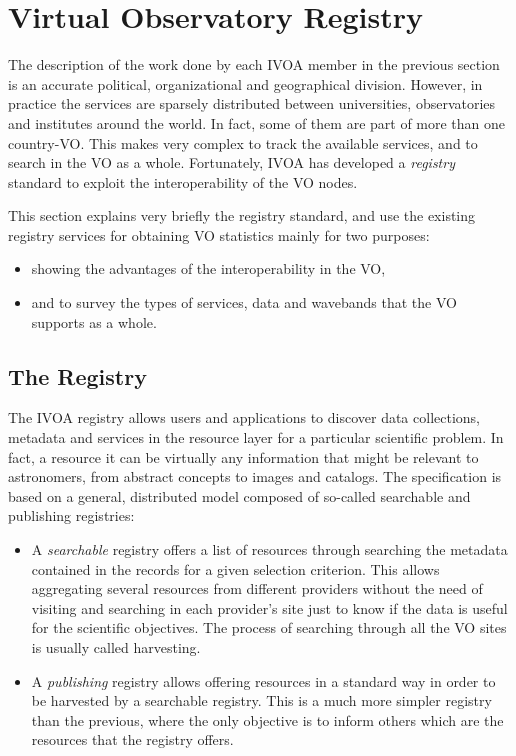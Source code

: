 \section{Virtual Observatory Registry}
\label{sec:registry}

The description of the work done by each IVOA member
in the previous section is an accurate political, organizational 
and geographical division. However, in practice the services
are sparsely distributed between universities, observatories
and institutes around the world. In fact, some of them 
are part of more than one country-VO. 
This makes very complex to track the available services, 
and to search in the VO as a whole. Fortunately, 
IVOA has developed a \emph{registry} standard to 
exploit the interoperability of the VO nodes.

This section explains very briefly the registry standard,
and use the existing registry services for obtaining VO 
statistics mainly for two purposes:
\begin{itemize}
\item showing the advantages of the interoperability in the VO,
\item and to survey the types of services, data and wavebands that
the VO supports as a whole.
\end{itemize}

\subsection{The Registry}

The IVOA registry allows users and applications to discover data collections,
metadata and services in the resource layer for a particular scientific
problem. In fact, a resource it can be virtually any information that might be
relevant to astronomers, from abstract concepts to images and catalogs. 
The specification is based on a general, distributed model composed of
so-called searchable and publishing registries:
\begin{itemize}
\item A \emph{searchable} registry offers a list of resources through searching the 
metadata contained in the records for a given selection criterion.
This allows aggregating several resources from different providers 
without the need of visiting and searching in each provider's site just to
know if the data is useful for the scientific objectives.
The process of searching through all the VO sites is usually called harvesting.
\item A \emph{publishing} registry allows offering resources in a standard way
in order to be harvested by a searchable registry. This is a much more
simpler registry than the previous, where the only objective is to 
inform others which are the resources that the registry offers.
\end{itemize}

